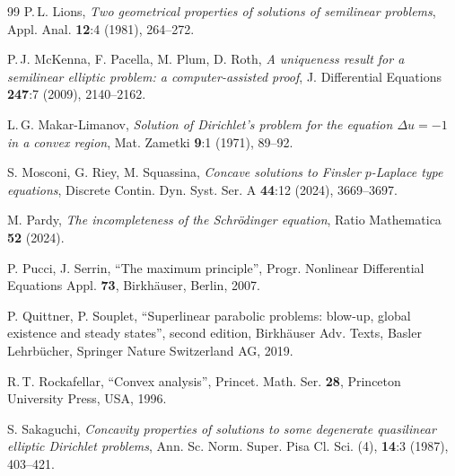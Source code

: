 \documentclass[12pt]{amsart}
\numberwithin{equation}{section}
\theoremstyle{plain}
\theoremstyle{plain}
\theoremstyle{plain}
\theoremstyle{definition}
\begin{document}
\begin{thebibliography}{99}
P.$\,$L. Lions,
\emph{Two geometrical properties of solutions of semilinear problems},
Appl. Anal. \textbf{12}:4 (1981), 264--272.

P.$\,$J. McKenna, F. Pacella, M. Plum, D. Roth,
\emph{A uniqueness result for a semilinear elliptic problem: a computer-assisted proof},
J. Differential Equations \textbf{247}:7 (2009), 2140--2162.

L.$\,$G. Makar-Limanov, 
\emph{Solution of Dirichlet’s problem for the equation $\Delta u = - 1$ in a convex region},
Mat. Zametki \textbf{9}:1 (1971), 89--92.

S. Mosconi, G. Riey, M. Squassina, 
\emph{Concave solutions to Finsler $p$-Laplace type equations}, 
Discrete Contin. Dyn. Syst. Ser. A \textbf{44}:12 (2024), 3669--3697.






M. Pardy,
\emph{The incompleteness of the Schrödinger equation},
Ratio Mathematica \textbf{52} (2024). 

P. Pucci, J. Serrin, 
``The maximum principle'',
Progr. Nonlinear Differential Equations Appl. \textbf{73}, Birkhäuser, Berlin, 2007.

P. Quittner, P. Souplet,
``Superlinear parabolic problems: blow-up, global existence and steady states'',
second edition, Birkhäuser Adv. Texts, Basler Lehrbücher, Springer Nature Switzerland AG, 2019.

R.$\,$T. Rockafellar,
``Convex analysis'',
Princet. Math. Ser. \textbf{28}, Princeton University Press, USA, 1996.

S. Sakaguchi,
\emph{Concavity properties of solutions to some degenerate quasilinear elliptic Dirichlet problems},
Ann. Sc. Norm. Super. Pisa Cl. Sci. (4), \textbf{14}:3 (1987), 403--421.


\end{thebibliography}
\end{document}
